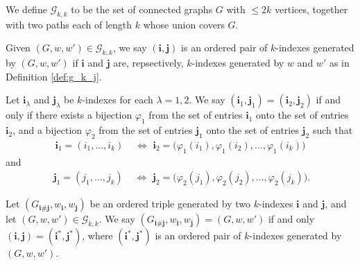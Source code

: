 \begin{definition}
  \notready
  \label{def:graph_walk_triple_set}
  \uses{} %
  We define $\mathcal{G}_{k,k}$ to be the set of connected graphs $G$ with $\leq 2k$ vertices,
  together with two paths each of length $k$ whose union covers $G$.
\end{definition}


\begin{definition}
  \notready
  \label{def:index_pair}
  Given $(G,w,w') \in \mathcal{G}_{k,k}$, we say $(\mathbf{i},\mathbf{j})$ is an ordered pair of $k$-indexes generated by $(G,w,w')$
  if $\mathbf{i}$ and $\mathbf{j}$ are, repsectively, $k$-indexes generated by $w$ and $w'$ as in Definition \ref{def:g_k_j}.
\end{definition}


\begin{definition}
  \notready
  \label{def:index_pair_rel}
  \uses{} %
  Let $\mathbf{i}_\lambda$ and $\mathbf{j}_\lambda$ be $k$-indexes for each $\lambda=1,2$.
  We say $(\mathbf{i}_1,\mathbf{j}_1) = (\mathbf{i}_2,\mathbf{j}_2)$ if and only if there exists a
  bijection $\varphi_1$ from the set of entries $\mathbf{i}_1$ onto the set of entries $\mathbf{i}_2$,
  and a bijection $\varphi_2$ from the set of entries $\mathbf{j}_1$ onto the set of entries $\mathbf{j}_2$ such that
  \begin{equation}
  \begin{split}
    \mathbf{i}_1 = (i_1,...,i_k) & \,\, \Longleftrightarrow \,\, \mathbf{i}_2 = \bigl( \varphi_1(i_1),\varphi_1(i_2),...,\varphi_1(i_k) \bigl)
  \end{split}
  \end{equation}
  and
  \begin{equation}
  \begin{split}
    \phantom{.}\mathbf{j}_1 = (j_1,...,j_k) & \,\, \Longleftrightarrow \,\, \mathbf{j}_2 = \bigl( \varphi_2(j_1),\varphi_2(j_2),...,\varphi_2(j_k) \bigl).
  \end{split}
  \end{equation}
\end{definition}


\begin{definition}
  \notready
  \label{def:graph_walk_triple_rel}
  Let $(G_{\mathbf{i} \# \mathbf{j}},w_\mathbf{i},w_\mathbf{j})$ be an ordered triple generated by
  two $k$-indexes $\mathbf{i}$ and $\mathbf{j}$, and let $(G,w,w') \in \mathcal{G}_{k,k}$.
  We say $(G_{\mathbf{i} \# \mathbf{j}},w_\mathbf{i},w_\mathbf{j}) = (G,w,w')$ if and only
  $(\mathbf{i},\mathbf{j}) = (\mathbf{i}^*,\mathbf{j}^*)$,
  where $(\mathbf{i}^*,\mathbf{j}^*)$ is an ordered pair of $k$-indexes generated by $(G,w,w')$.
\end{definition}



